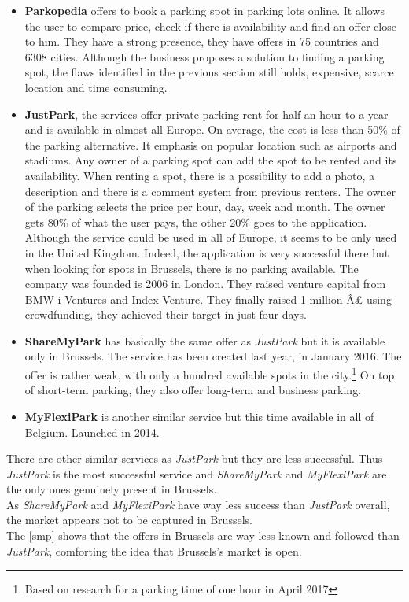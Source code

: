 \documentclass[12pt,a4paper,oneside]{book}
\begin{document}
\begin{itemize}
\item \textbf{Parkopedia} offers to book a parking spot in parking lots online. It allows the user to compare price, check if there is availability and find an offer close to him. They have a strong presence, they have offers in 75 countries and 6308 cities. Although the business proposes a solution to finding a parking spot, the flaws identified in the previous section still holds, expensive, scarce location and time consuming.
\item \textbf{JustPark}, the services offer private parking rent for half an hour to a year and is available in almost all Europe. On average, the cost is less than 50\% of the parking alternative. It emphasis on popular location such as airports and stadiums. Any owner of a parking spot can add the spot to be rented and its availability. When renting a spot, there is a possibility to add a photo, a description and there is a comment system from previous renters. The owner of the parking selects the price per hour, day, week and month. The owner gets 80\% of what the user pays, the other 20\% goes to the application. Although the service could be used in all of Europe, it seems to be only used in the United Kingdom. Indeed, the application is very successful there but when looking for spots in Brussels, there is no parking available. The company was founded is 2006 in London. They raised venture capital from BMW i Ventures\cite{bmwi} and Index Venture.\cite{iven} They finally raised 1 million Â£ using crowdfunding, they achieved their target in just four days.\cite{crowd}
\item \textbf{ShareMyPark} has basically the same offer as \textit{JustPark} but it is available only in Brussels. The service has been created last year, in January 2016. The offer is rather weak, with only a hundred available spots in the city.\footnote{Based on research for a parking time of one hour in April 2017} On top of short-term parking, they also offer long-term and business parking.
\item \textbf{MyFlexiPark} is another similar service but this time available in all of Belgium. Launched in 2014.
\end{itemize}

There are other similar services as \textit{JustPark} but they are less successful. Thus \textit{JustPark} is the most successful service and \textit{ShareMyPark} and \textit{MyFlexiPark} are the only ones genuinely present in Brussels.\\
As \textit{ShareMyPark} and \textit{MyFlexiPark} have way less success than \textit{JustPark} overall, the market appears not to be captured in Brussels.\\
The \autoref{smp} shows that the offers in Brussels are way less known and followed than \textit{JustPark}, comforting the idea that Brussels's market is open.
\end{document}
